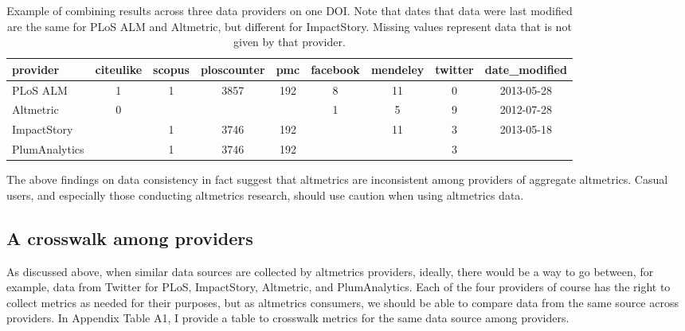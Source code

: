 \documentclass[letterpaper,superscriptaddress,showkeys,longbibliography]{revtex4-1}\usepackage{graphicx, color}
\begin{document}
\begin{table}[ht]
\centering
\caption{Example of combining results across three data providers on one DOI. Note that dates that data were last modified are the same for PLoS ALM and Altmetric, but different for ImpactStory. Missing values represent data that is not given by that provider.} 
\begin{tabular}{l|cccccccc}
  \hline
provider & citeulike & scopus & ploscounter & pmc & facebook & mendeley & twitter & date\_modified \\ 
  \hline
PLoS ALM & 1 & 1 & 3857 & 192 & 8 & 11 & 0 & 2013-05-28 \\ 
  Altmetric & 0 &  &  &  & 1 & 5 & 9 & 2012-07-28 \\ 
  ImpactStory &  & 1 & 3746 & 192 &  & 11 & 3 & 2013-05-18 \\ 
  PlumAnalytics &  & 1 & 3746 & 192 &  &  & 3 &  \\ 
   \hline
\end{tabular}
\end{table}




The above findings on data consistency in fact suggest that altmetrics are inconsistent among providers of aggregate altmetrics. Casual users, and especially those conducting altmetrics research, should use caution when using altmetrics data.  

\subsection*{A crosswalk among providers}

As discussed above, when similar data sources are collected by altmetrics providers, ideally, there would be a way to go between, for example, data from Twitter for PLoS, ImpactStory, Altmetric, and PlumAnalytics. Each of the four providers of course has the right to collect metrics as needed for their purposes, but as altmetrics consumers, we should be able to compare data from the same source across providers. In Appendix Table A1, I provide a table to crosswalk metrics for the same data source among providers.
\end{document}
